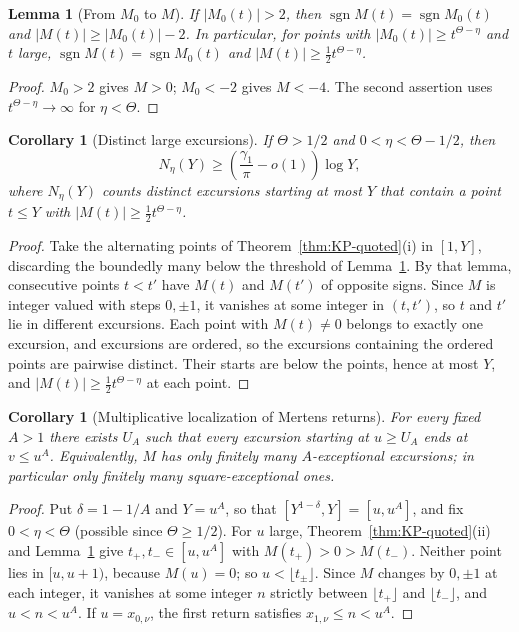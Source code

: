 \documentclass[11pt]{amsart}
\numberwithin{equation}{section}
\theoremstyle{plain}
\newtheorem{lemma}[theorem]{Lemma}
\newtheorem{corollary}[theorem]{Corollary}
\theoremstyle{definition}
\theoremstyle{remark}
\DeclareMathOperator{\sgn}{sgn}
\begin{document}
\begin{lemma}[From $M_0$ to $M$]
\label{lem:KP-translation}
If $|M_0(t)|>2$, then $\sgn M(t)=\sgn M_0(t)$ and
$|M(t)|\ge|M_0(t)|-2$. In particular, for points with
$|M_0(t)|\ge t^{\Theta-\eta}$ and $t$ large,
$\sgn M(t)=\sgn M_0(t)$ and $|M(t)|\ge\frac12t^{\Theta-\eta}$.
\end{lemma}

\begin{proof}
$M_0>2$ gives $M>0$; $M_0<-2$ gives $M<-4$. The second assertion uses
$t^{\Theta-\eta}\to\infty$ for $\eta<\Theta$.
\end{proof}

\begin{corollary}[Distinct large excursions]
\label{cor:KP-large-excursions}
\label{thm:KP-M}
If $\Theta>1/2$ and $0<\eta<\Theta-1/2$, then
\begin{equation}
\label{eq:KP-large-excursions}
N_\eta(Y)\ge\left(\frac{\gamma_1}{\pi}-o(1)\right)\log Y,
\end{equation}
where $N_\eta(Y)$ counts distinct excursions starting at most $Y$ that
contain a point $t\le Y$ with $|M(t)|\ge\tfrac12 t^{\Theta-\eta}$.
\end{corollary}

\begin{proof}
Take the alternating points of Theorem~\ref{thm:KP-quoted}(i) in $[1,Y]$,
discarding the boundedly many below the threshold of
Lemma~\ref{lem:KP-translation}. By that lemma, consecutive points $t<t'$
have $M(t)$ and $M(t')$ of opposite signs. Since $M$ is integer valued with
steps $0,\pm1$, it vanishes at some integer in $(t,t')$, so $t$ and $t'$ lie
in different excursions. Each point with $M(t)\ne0$ belongs to exactly one
excursion, and excursions are ordered, so the excursions containing the
ordered points are pairwise distinct. Their starts are below the points,
hence at most $Y$, and $|M(t)|\ge\frac12t^{\Theta-\eta}$ at each point.
\end{proof}

\begin{corollary}[Multiplicative localization of Mertens returns]
\label{cor:KP-local-returns}
\label{cor:finiteness_expanding}
For every fixed $A>1$ there exists $U_A$ such that every excursion starting
at $u\ge U_A$ ends at $v\le u^A$. Equivalently, $M$ has only finitely many
$A$-exceptional excursions; in particular only finitely many
square-exceptional ones.
\end{corollary}

\begin{proof}
Put $\delta=1-1/A$ and $Y=u^A$, so that $[Y^{1-\delta},Y]=[u,u^A]$, and fix
$0<\eta<\Theta$ (possible since $\Theta\ge1/2$). For $u$ large,
Theorem~\ref{thm:KP-quoted}(ii) and Lemma~\ref{lem:KP-translation} give
$t_+,t_-\in[u,u^A]$ with $M(t_+)>0>M(t_-)$. Neither point lies in $[u,u+1)$,
because $M(u)=0$; so $u<\lfloor t_\pm\rfloor$. Since $M$ changes by
$0,\pm1$ at each integer, it vanishes at some integer $n$ strictly between
$\lfloor t_+\rfloor$ and $\lfloor t_-\rfloor$, and $u<n<u^A$. If
$u=x_{0,\nu}$, the first return satisfies $x_{1,\nu}\le n<u^A$.
\end{proof}
\end{document}
